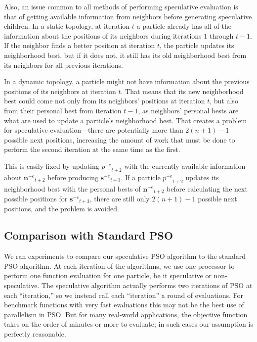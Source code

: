 \documentclass[journal,letterpaper]{IEEEtran}
\providecommand{\noeval}[1]{\ensuremath{#1^{-e}}}
\providecommand{\p}{\ensuremath{p}}
\providecommand{\sset}{\ensuremath{\mathbf{s}}}
\providecommand{\nset}{\ensuremath{\mathbf{n}}}
\begin{document}
Also, an issue common to all methods of performing speculative evaluation is
that of getting available information from neighbors before generating
speculative children.  In a static topology, at iteration $t$ a particle
already has all of the information about the positions of its neighbors during
iterations $1$ through $t-1$.  If the neighbor finds a better position at 
iteration $t$, the particle updates its neighborhood best, but if it does not,
it still has its old neighborhood best from its neighbors for all previous 
iterations.

In a dynamic topology, a particle might not have information about the previous
positions of its neighbors at iteration $t$.  That means that its new
neighborhood best could come not only from its neighbors' positions at
iteration $t$, but also from their personal best from iteration $t-1$, as
neighbors' personal bests are what are used to update a particle's neighborhood
best.  That creates a problem for speculative evaluation---there are
potentially more than $2(n+1)-1$ possible next positions, increasing the amount
of work that must be done to perform the second iteration at the same time as
the first.

This is easily fixed by updating $\noeval{\p}_{t+2}$ with the currently
available information about $\noeval{\nset}_{t+2}$ before producing
$\noeval{\sset}_{t+3}$.  If a particle $\noeval{\p}_{t+2}$ updates its 
neighborhood best with the personal bests of $\noeval{\nset}_{t+2}$ before
calculating the next possible positions for $\noeval{\sset}_{t+3}$, there are
still only $2(n+1)-1$ possible next positions, and the problem is avoided.

\subsection{Comparison with Standard PSO}

We ran experiments to compare our speculative PSO algorithm to the standard
PSO algorithm.  At each iteration of the algorithms, we use one processor to
perform one function evaluation for one particle, be it speculative or
non-speculative.  The speculative algorithm actually performs two iterations of
PSO at each ``iteration,'' so we instead call each ``iteration'' a round of
evaluations.  For benchmark functions with very fast evaluations this may not
be the best use of parallelism in PSO.  But for many real-world applications,
the objective function takes on the order of minutes or more to evaluate; in
such cases our assumption is perfectly reasonable.
\end{document}
